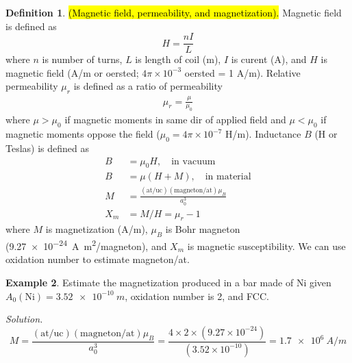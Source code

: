\documentclass{article}
\theoremstyle{definition}
\newtheorem{definition}{Definition}[section]
\newtheorem{example}[definition]{Example}
\begin{document}
\begin{definition}
    \hl{(Magnetic field, permeability, and magnetization).} Magnetic field is defined as
    \begin{equation}
        H = \frac{nI}{L}
    \end{equation}
    where $n$ is number of turns, $L$ is length of coil (m), $I$ is curent (A), and $H$ is magnetic field (A/m or oersted; $4\pi \times 10^{-3}$ oersted = 1 A/m). Relative permeability $\mu_r$ is defined as a ratio of permeability
    \begin{align}
        \mu_r = \frac{\mu}{\mu_0}
    \end{align}
    where $\mu > \mu_0$ if magnetic moments in same dir of applied field and $\mu < \mu_0$ if magnetic moments oppose the field ($\mu_0 = 4\pi \times 10^{-7}$ H/m). Inductance $B$ (H or Teslas) is defined as
    \begin{align}
        B &= \mu_0 H, \quad \text{in vacuum} \\
        B &= \mu (H + M), \quad \text{in material} \\
        M &= \frac{(\text{at/uc}) (\text{magneton/at}) \mu_B}{a_0^3} \\
        X_m &= M/H = \mu_r - 1
    \end{align}
    where $M$ is magnetization (A/m), $\mu_B$ is Bohr magneton (\SI{9.27e-24}{\ampere.\metre^2/magneton}), and $X_m$ is magnetic susceptibility. We can use oxidation number to estimate magneton/at.
\end{definition}

\begin{example}
    Estimate the magnetization produced in a bar made of Ni given $A_0(\text{Ni}) = \SI{3.52e-10}{m}$, oxidation number is 2, and FCC.
    
    \textit{Solution.}
    \begin{equation*}
        M = \frac{(\text{at/uc}) (\text{magneton/at}) \mu_B}{a_0^3} = \frac{4 \times 2 \times (9.27\times10^{-24})}{(3.52 \times 10^{-10})} = \SI{1.7e6}{A/m}
    \end{equation*}
\end{example}
\end{document}
